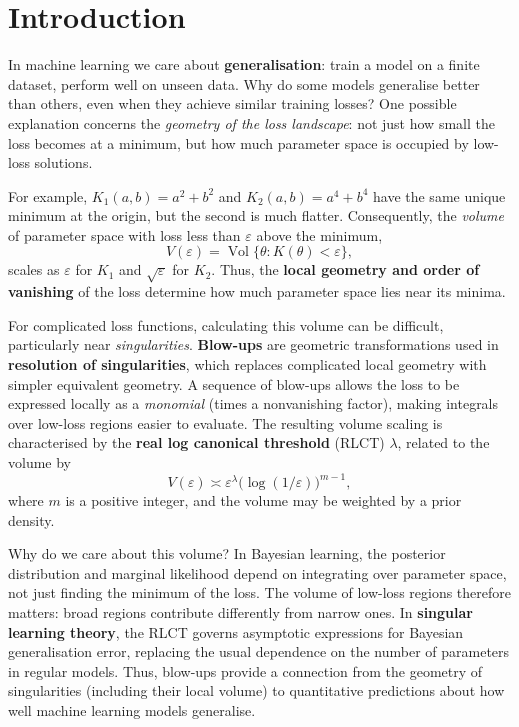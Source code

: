 \documentclass[12pt]{article}
\begin{document}

\newpage
\section{Introduction}

In machine learning we care about \textbf{generalisation}: train a model on a finite dataset, perform well on unseen data. Why do some models generalise better than others, even when they achieve similar training losses? One possible explanation concerns the \emph{geometry of the loss landscape}: not just how small the loss becomes at a minimum, but how much parameter space is occupied by low-loss solutions.

For example, $K_1(a,b)=a^2+b^2$ and $K_2(a,b)=a^4+b^4$ have
the same unique minimum at the origin, but the second is much
flatter. Consequently, the \emph{volume} of parameter space with loss
less than $\varepsilon$ above the minimum,
\[
    V(\varepsilon)
    = \operatorname{Vol}\{\theta:K(\theta)<\varepsilon\},
\]
scales as $\varepsilon$ for $K_1$ and $\sqrt{\varepsilon}$ for
$K_2$. Thus, the \textbf{local geometry and order of vanishing}
of the loss determine how much parameter space lies near its minima.

For complicated loss functions, calculating this volume can be difficult, particularly near \emph{singularities}. \textbf{Blow-ups} are geometric transformations used in
\textbf{resolution of singularities}, which replaces complicated
local geometry with simpler equivalent geometry. A sequence of blow-ups allows the loss to be expressed locally
as a \emph{monomial} (times a nonvanishing factor), making integrals
over low-loss regions easier to evaluate. The resulting volume
scaling is characterised by the \textbf{real log canonical
threshold} (RLCT) $\lambda$, related to the volume by
\[
    V(\varepsilon)\asymp
    \varepsilon^\lambda
    \bigl(\log(1/\varepsilon)\bigr)^{m-1},
\]
where $m$ is a positive integer, and the volume may be weighted
by a prior density.

Why do we care about this volume? In Bayesian learning,
the posterior distribution and marginal likelihood depend on
integrating over parameter space, not just finding the
minimum of the loss. The volume of low-loss regions therefore
matters: broad regions contribute differently from narrow ones.
In \textbf{singular learning theory}, the RLCT governs asymptotic expressions
for Bayesian generalisation error, replacing the usual dependence
on the number of parameters in regular models. Thus, blow-ups provide a
connection from the geometry of singularities (including their local volume) to quantitative
predictions about how well machine learning models generalise.
\end{document}
